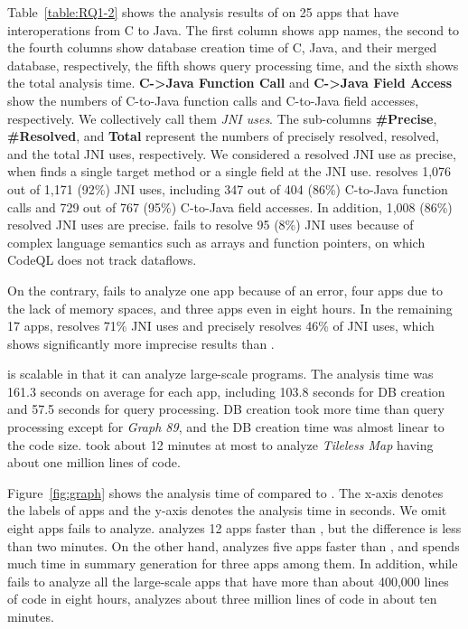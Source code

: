 Table~\ref{table:RQ1-2} shows the analysis results of \ours on 25 apps that have
interoperations from C to Java.
The first column shows app names, the second to the fourth columns show
database creation time of C, Java, and their merged database, respectively, the
fifth shows query processing time, and the sixth shows the total analysis time.
{\bf C->Java Function Call} and {\bf C->Java Field Access} show the numbers of
C-to-Java function calls and C-to-Java field accesses, respectively. We
collectively call them \emph{JNI uses}.
The sub-columns {\bf \#Precise}, {\bf \#Resolved}, and {\bf Total} represent
the numbers of precisely resolved, resolved, and the total JNI uses,
respectively.
We considered a resolved JNI use as precise, when \ours finds a single target
method or a single field at the JNI use.
\ours resolves 1,076 out of 1,171 (92\%) JNI uses, including 347 out of 404
(86\%) C-to-Java function calls and 729 out of 767 (95\%) C-to-Java field
accesses. 
In addition, 1,008 (86\%) resolved JNI uses are precise.
\ours fails to resolve 95 (8\%) JNI uses because of complex language semantics
such as arrays and function pointers, on which
CodeQL does not track dataflows.

On the contrary,
\lees fails to analyze one app because of an error, four apps due to the lack
of memory spaces, and three apps even in eight hours.  
In the remaining 17 apps, \lees resolves 71\% JNI uses
and precisely resolves 46\% of JNI uses,
which shows significantly more imprecise results than \ours.

\ours is scalable in that it can analyze large-scale programs. 
The analysis time was 161.3 seconds on average for each app, including 103.8
seconds for DB creation and 57.5 seconds for query processing.  
DB creation took more time than query processing except for {\it Graph 89}, and
the DB creation time was almost linear to the code size. 
\ours took about 12 minutes at most to analyze {\it Tileless Map} having about
one million lines of code.

Figure~\ref{fig:graph} shows the analysis time of \ours compared to \lees.
The x-axis denotes the labels of apps and the y-axis denotes the analysis time
in seconds. We omit eight apps \lees fails to analyze.
\lees analyzes 12 apps faster than \ours, but the difference is less than two
minutes. 
On the other hand, \ours analyzes five apps faster than \lees, and \lees spends
much time in summary generation for three apps among them. 
In addition, while \lees fails to analyze all the large-scale apps that have
more than about 400,000 lines of code in eight hours, \ours analyzes about
three million lines of code in about ten minutes.

